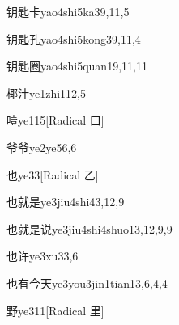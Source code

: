 \begin{verbete}{钥匙卡}{yao4shi5ka3}{9,11,5}
\end{verbete}

\begin{verbete}{钥匙孔}{yao4shi5kong3}{9,11,4}
\end{verbete}

\begin{verbete}{钥匙圈}{yao4shi5quan1}{9,11,11}
\end{verbete}

\begin{verbete}{椰汁}{ye1zhi1}{12,5}
\end{verbete}

\begin{verbete}{噎}{ye1}{15}[Radical 口]
\end{verbete}

\begin{verbete}{爷爷}{ye2ye5}{6,6}
\end{verbete}

\begin{verbete}{也}{ye3}{3}[Radical 乙]
\end{verbete}

\begin{verbete}{也就是}{ye3jiu4shi4}{3,12,9}
\end{verbete}

\begin{verbete}{也就是说}{ye3jiu4shi4shuo1}{3,12,9,9}
\end{verbete}

\begin{verbete}{也许}{ye3xu3}{3,6}
\end{verbete}

\begin{verbete}{也有今天}{ye3you3jin1tian1}{3,6,4,4}
\end{verbete}

\begin{verbete}{野}{ye3}{11}[Radical 里]
\end{verbete}

